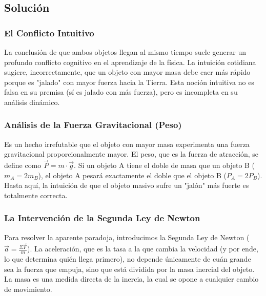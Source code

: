 \documentclass[12pt]{article}
\begin{document}
\subsection*{Solución}

\subsubsection*{El Conflicto Intuitivo}
La conclusión de que ambos objetos llegan al mismo tiempo suele generar un profundo conflicto cognitivo en el aprendizaje de la física. La intuición cotidiana sugiere, incorrectamente, que un objeto con mayor masa debe caer más rápido porque es "jalado" con mayor fuerza hacia la Tierra. Esta noción intuitiva no es falsa en su premisa (sí es jalado con más fuerza), pero es incompleta en su análisis dinámico.

\subsubsection*{Análisis de la Fuerza Gravitacional (Peso)}
Es un hecho irrefutable que el objeto con mayor masa experimenta una fuerza gravitacional proporcionalmente mayor. El peso, que es la fuerza de atracción, se define como $\vec{P} = m \cdot \vec{g}$. 
Si un objeto A tiene el doble de masa que un objeto B ($m_A = 2m_B$), el objeto A pesará exactamente el doble que el objeto B ($P_A = 2P_B$). Hasta aquí, la intuición de que el objeto masivo sufre un "jalón" más fuerte es totalmente correcta.

\subsubsection*{La Intervención de la Segunda Ley de Newton}
Para resolver la aparente paradoja, introducimos la Segunda Ley de Newton ($\vec{a} = \frac{\Sigma \vec{F}}{m}$). La aceleración, que es la tasa a la que cambia la velocidad (y por ende, lo que determina quién llega primero), no depende únicamente de cuán grande sea la fuerza que empuja, sino que está dividida por la masa inercial del objeto. La masa es una medida directa de la inercia, la cual se opone a cualquier cambio de movimiento.
\end{document}
